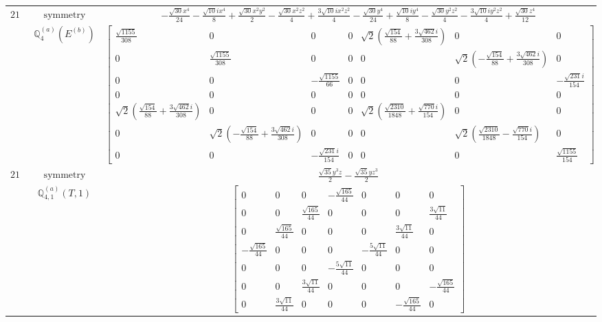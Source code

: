 \documentclass[fleqn,8pt,landscape]{jsarticle}
\begin{document}
\begin{longtable}{ccc}
$ 216 $ & $ \text{symmetry} $ & $ - \frac{\sqrt{30} x^{4}}{24} - \frac{\sqrt{10} i x^{4}}{8} + \frac{\sqrt{30} x^{2} y^{2}}{2} - \frac{\sqrt{30} x^{2} z^{2}}{4} + \frac{3 \sqrt{10} i x^{2} z^{2}}{4} - \frac{\sqrt{30} y^{4}}{24} + \frac{\sqrt{10} i y^{4}}{8} - \frac{\sqrt{30} y^{2} z^{2}}{4} - \frac{3 \sqrt{10} i y^{2} z^{2}}{4} + \frac{\sqrt{30} z^{4}}{12} $ \\
$  $ & $ \mathbb{Q}_{4}^{(a)}(E^{(b)}) $ & $ \begin{bmatrix} \frac{\sqrt{1155}}{308} & 0 & 0 & 0 & \sqrt{2} \left(\frac{\sqrt{154}}{88} + \frac{3 \sqrt{462} i}{308}\right) & 0 & 0 \\ 0 & \frac{\sqrt{1155}}{308} & 0 & 0 & 0 & \sqrt{2} \left(- \frac{\sqrt{154}}{88} + \frac{3 \sqrt{462} i}{308}\right) & 0 \\ 0 & 0 & - \frac{\sqrt{1155}}{66} & 0 & 0 & 0 & - \frac{\sqrt{231} i}{154} \\ 0 & 0 & 0 & 0 & 0 & 0 & 0 \\ \sqrt{2} \left(\frac{\sqrt{154}}{88} + \frac{3 \sqrt{462} i}{308}\right) & 0 & 0 & 0 & \sqrt{2} \left(\frac{\sqrt{2310}}{1848} + \frac{\sqrt{770} i}{154}\right) & 0 & 0 \\ 0 & \sqrt{2} \left(- \frac{\sqrt{154}}{88} + \frac{3 \sqrt{462} i}{308}\right) & 0 & 0 & 0 & \sqrt{2} \left(\frac{\sqrt{2310}}{1848} - \frac{\sqrt{770} i}{154}\right) & 0 \\ 0 & 0 & - \frac{\sqrt{231} i}{154} & 0 & 0 & 0 & \frac{\sqrt{1155}}{154} \end{bmatrix} $ \\ \hline
$ 217 $ & $ \text{symmetry} $ & $ \frac{\sqrt{35} y^{3} z}{2} - \frac{\sqrt{35} y z^{3}}{2} $ \\
$  $ & $ \mathbb{Q}_{4,1}^{(a)}(T,1) $ & $ \begin{bmatrix} 0 & 0 & 0 & - \frac{\sqrt{165}}{44} & 0 & 0 & 0 \\ 0 & 0 & \frac{\sqrt{165}}{44} & 0 & 0 & 0 & \frac{3 \sqrt{11}}{44} \\ 0 & \frac{\sqrt{165}}{44} & 0 & 0 & 0 & \frac{3 \sqrt{11}}{44} & 0 \\ - \frac{\sqrt{165}}{44} & 0 & 0 & 0 & - \frac{5 \sqrt{11}}{44} & 0 & 0 \\ 0 & 0 & 0 & - \frac{5 \sqrt{11}}{44} & 0 & 0 & 0 \\ 0 & 0 & \frac{3 \sqrt{11}}{44} & 0 & 0 & 0 & - \frac{\sqrt{165}}{44} \\ 0 & \frac{3 \sqrt{11}}{44} & 0 & 0 & 0 & - \frac{\sqrt{165}}{44} & 0 \end{bmatrix} $ \\ \hline

\end{longtable}
\end{document}
